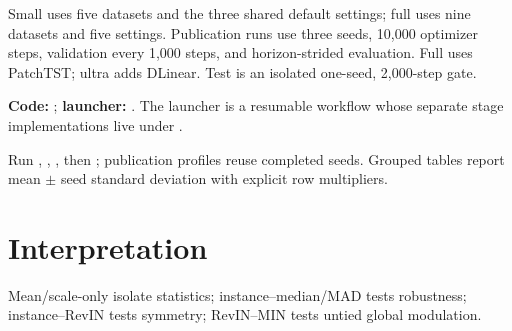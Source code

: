 \documentclass[10pt]{article}
\begin{document}
Small uses five datasets and the three shared default settings; full uses nine
datasets and five settings. Publication runs use three seeds, 10,000 optimizer
steps, validation every 1,000 steps, and horizon-strided evaluation. Full uses
PatchTST; ultra adds DLinear. Test is an isolated one-seed, 2,000-step gate.

\textbf{Code:} ; \textbf{launcher:} .
The launcher is a resumable  workflow whose separate stage
implementations live under .

Run , , , then ; publication
profiles reuse completed seeds. Grouped tables report mean $\pm$ seed standard
deviation with explicit row multipliers.

\section{Interpretation}
Mean/scale-only isolate statistics; instance--median/MAD tests robustness;
instance--RevIN tests symmetry; RevIN--MIN tests untied global modulation.
\end{document}

